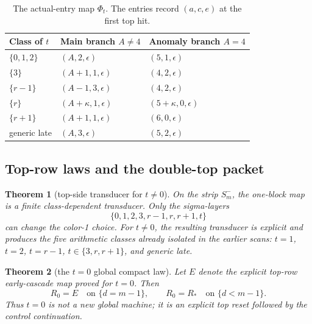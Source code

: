 \documentclass[11pt]{article}
\newtheorem{theorem}{Theorem}[section]
\newcommand{\1}{\mathbf 1}
\begin{document}
\begin{table}[t]
\centering
\caption{The actual-entry map \(\Phi_t\). The entries record \((a,c,e)\) at the first top hit.}
\label{tab:actual-entry}
\begin{tabular}{@{}p{}p{}p{}@{}}
\toprule
Class of \(t\) & Main branch \(A\ne 4\) & Anomaly branch \(A=4\) \\
\midrule
\(\{0,1,2\}\) & \((A,2,\epsilon)\) & \((5,1,\epsilon)\) \\
\(\{3\}\) & \((A+1,1,\epsilon)\) & \((4,2,\epsilon)\) \\
\(\{r-1\}\) & \((A-1,3,\epsilon)\) & \((4,2,\epsilon)\) \\
\(\{r\}\) & \((A+\kappa,1,\epsilon)\) & \((5+\kappa,0,\epsilon)\) \\
\(\{r+1\}\) & \((A+1,1,\epsilon)\) & \((6,0,\epsilon)\) \\
generic late & \((A,3,\epsilon)\) & \((5,2,\epsilon)\) \\
\bottomrule
\end{tabular}
\end{table}

\subsection{Top-row laws and the double-top packet}

\begin{theorem}[top-side transducer for \(t\ne 0\)]
On the strip \(S_m^-\), the one-block map is a finite class-dependent transducer.
Only the sigma-layers
\[
\{0,1,2,3,r-1,r,r+1,t\}
\]
can change the color-1 choice.
For \(t\ne 0\), the resulting transducer is explicit and produces the five arithmetic classes already isolated in the earlier scans:
\(t=1\), \(t=2\), \(t=r-1\), \(t\in\{3,r,r+1\}\), and generic late.
\end{theorem}

\begin{theorem}[the \(t=0\) global compact law]
Let \(E\) denote the explicit top-row early-cascade map proved for \(t=0\).
Then
\[
R_0 = E \quad\text{on }\{d=m-1\},
\qquad
R_0 = R_* \quad\text{on }\{d<m-1\}.
\]
Thus \(t=0\) is not a new global machine; it is an explicit top reset followed by the control continuation.
\end{theorem}
\end{document}
